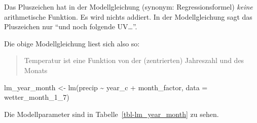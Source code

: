\documentclass[
  letterpaper,
  oneside,
  open=any]{scrbook}
\newenvironment{Shaded}{\begin{snugshade}}{\end{snugshade}}
\newcommand{\AttributeTok}[1]{\textcolor[rgb]{0.40,0.45,0.13}{#1}}
\newcommand{\FunctionTok}[1]{\textcolor[rgb]{0.28,0.35,0.67}{#1}}
\newcommand{\NormalTok}[1]{\textcolor[rgb]{0.00,0.23,0.31}{#1}}
\newcommand{\OtherTok}[1]{\textcolor[rgb]{0.00,0.23,0.31}{#1}}
\newcommand{\SpecialCharTok}[1]{\textcolor[rgb]{0.37,0.37,0.37}{#1}}
\theoremstyle{definition}
\theoremstyle{definition}
\theoremstyle{definition}
\theoremstyle{remark}
\begin{document}
Das Pluszeichen hat in der Modellgleichung (synonym: Regressionsformel)
\emph{keine} arithmetische Funktion. Es wird nichts addiert. In der
Modellgleichung sagt das Pluszeichen nur \enquote{und noch folgende
UV\ldots{}}.

Die obige Modellgleichung liest sich also so:

\begin{quote}
Temperatur ist eine Funktion von der (zentrierten) Jahreszahl und des
Monats
\end{quote}

\begin{Shaded}
\begin{Highlighting}[]
\NormalTok{lm\_year\_month }\OtherTok{\textless{}{-}} \FunctionTok{lm}\NormalTok{(precip }\SpecialCharTok{\textasciitilde{}}\NormalTok{ year\_c }\SpecialCharTok{+}\NormalTok{ month\_factor, }
                    \AttributeTok{data =}\NormalTok{ wetter\_month\_1\_7)}
\end{Highlighting}
\end{Shaded}

Die Modellparameter sind in Tabelle~\ref{tbl-lm_year_month} zu sehen.
\end{document}
